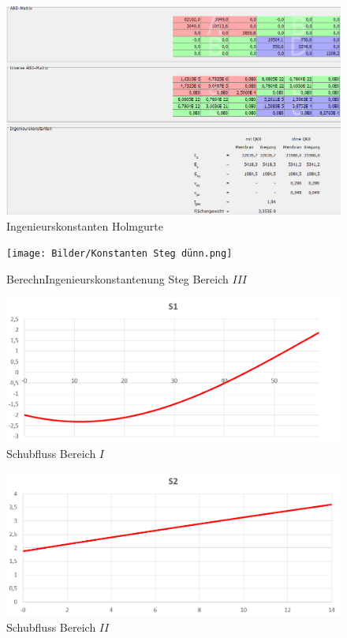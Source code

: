 \begin{figure}
	\includegraphics[width=1.0\textwidth]{Bilder/Konstanten Holmgurte.png}
	\caption{Ingenieurskonstanten Holmgurte}
	\label{fig:Ingenieurskonstanten Holmgurte}
\end{figure}
\begin{figure}
	\texttt{[image: Bilder/Konstanten Steg dünn.png]}
	\caption{BerechnIngenieurskonstantenung Steg Bereich $III$}
	\label{fig:Ingenieurskonstanten Steg dünn}
\end{figure}
\begin{figure}
	\includegraphics[width=1.0\textwidth]{Bilder/S1.png}
	\caption{Schubfluss Bereich $I$}
	\label{fig:S1}
\end{figure}
\begin{figure}
	\includegraphics[width=1.0\textwidth]{Bilder/S2.png}
	\caption{Schubfluss Bereich $II$}
	\label{fig:S2}
\end{figure}
